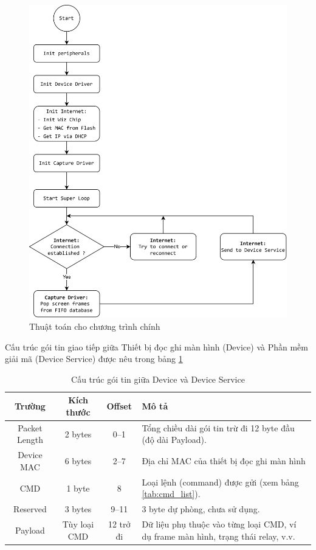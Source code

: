 \begin{figure}[!ht]
    \centering
    \includegraphics[width=1.0\linewidth]{Figures/flowcharts-Device_Main loop.png}
    \caption{Thuật toán cho chương trình chính}
    \label{fig:flowcharts-Device_Main loop}
\end{figure}

\FloatBarrier

Cấu trúc gói tin giao tiếp giữa Thiết bị đọc ghi màn hình (Device) và Phần mềm giải mã (Device Service) được nêu trong bảng \ref{tab:device-packet_structure}

\begin{table}[h!]
\centering
\begin{tabular}{|c|c|c|p{7cm}|}
\hline
\textbf{Trường} & \textbf{Kích thước} & \textbf{Offset} & \textbf{Mô tả} \\
\hline
Packet Length & 2 bytes & 0–1 & Tổng chiều dài gói tin trừ đi 12 byte đầu (độ dài Payload). \\
\hline
Device MAC & 6 bytes & 2–7 & Địa chỉ MAC của thiết bị đọc ghi màn hình \\
\hline
CMD & 1 byte & 8 & Loại lệnh (command) được gửi (xem bảng \ref{tab:cmd_list}). \\
\hline
Reserved & 3 bytes & 9–11 & 3 byte dự phòng, chưa sử dụng. \\
\hline
Payload & Tùy loại CMD & 12 trở đi & Dữ liệu phụ thuộc vào từng loại CMD, ví dụ frame màn hình, trạng thái relay, v.v. \\
\hline
\end{tabular}
\caption{Cấu trúc gói tin giữa Device và Device Service}
\label{tab:device-packet_structure}
\end{table}


